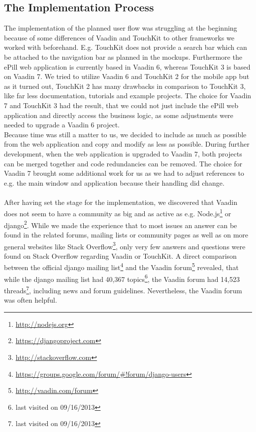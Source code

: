 \subsection{The Implementation Process}
\label{subsec:Implementation}
The implementation of the planned user flow was struggling at the beginning because of some differences of Vaadin and TouchKit to other frameworks we worked with beforehand. E.g. TouchKit does not provide a search bar which can be attached to the navigation bar as planned in the mockups. Furthermore the ePill web application is currently based in Vaadin 6, whereas TouchKit 3 is based on Vaadin 7. We tried to utilize Vaadin 6 and TouchKit 2 for the mobile app but as it turned out, TouchKit 2 has many drawbacks in comparison to TouchKit 3, like far less documentation, tutorials and example projects. The choice for Vaadin 7 and TouchKit 3 had the result, that we could not just include the ePill web application and directly access the business logic, as some adjustments were needed to upgrade a Vaadin 6 project. 
\\
Because time was still a matter to us, we decided to include as much as possible from the web application and copy and modify as less as possible. During further development, when the web application is upgraded to Vaadin 7, both projects can be merged together and code redundancies can be removed. The choice for Vaadin 7 brought some additional work for us as we had to adjust references to e.g. the main window and application because their handling did change.
\\
\\
After having set the stage for the implementation, we discovered that Vaadin does not seem to have a community as big and as active as e.g. Node.js\footnote{\url{http://nodejs.org}} or django\footnote{\url{https://djangoproject.com}}. While we made the experience that to most issues an answer can be found in the related forums, mailing lists or community pages as well as on more general websites like Stack Overflow\footnote{\url{http://stackoverflow.com}}, only very few answers and questions were found on Stack Overflow regarding Vaadin or TouchKit. A direct comparison between the official django mailing list\footnote{\url{https://groups.google.com/forum/\#!forum/django-users}} and the Vaadin forum\footnote{\url{http://vaadin.com/forum}} revealed, that while the django mailing list had 40,367 topics\footnote{last visited on 09/16/2013}, the Vaadin forum had 14,523 threads\footnote{last visited on 09/16/2013}, including news and forum guidelines. Nevertheless, the Vaadin forum was often helpful.
